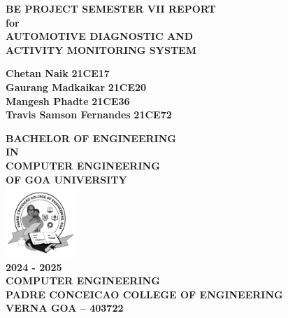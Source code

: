 \begin{titlepage}
    \centering
    \vspace*{0.5cm}
    
    {\Large \textbf{BE PROJECT SEMESTER VII REPORT}}\\[0.3cm]
    {\Large \textbf{for}}\\[0.3cm]
    {\Large \textbf{AUTOMOTIVE DIAGNOSTIC AND }}\\[0.3cm]
    {\Large \textbf{ACTIVITY MONITORING SYSTEM}}\\[0.5cm]

    \large
    \begin{center}
        {\textbf{Chetan Naik}} \hspace{3.7cm} {\textbf{21CE17}}\\[0.1cm]
        {\textbf{Gaurang Madkaikar}} \hspace{2cm} {\textbf{21CE20}}\\[0.1cm]
        {\textbf{Mangesh Phadte}} \hspace{2.8cm} {\textbf{21CE36}}\\[0.1cm]
        {\textbf{Travis Samson Fernandes}} \hspace{0.8cm} {\textbf{21CE72}}
    \end{center}
    
    {\large \textbf{BACHELOR OF ENGINEERING}}\\[0.3cm]
    {\large \textbf{IN}}\\[0.3cm]
    {\large \textbf{COMPUTER ENGINEERING}}\\[0.3cm]
    {\large \textbf{OF GOA UNIVERSITY}}\\[1cm]
    
    \includegraphics[width=0.2\textwidth]{assets/logo.png}\\[0.2cm]
    
    {\LARGE \textbf{2024 - 2025}}\\[1cm]
    
    \large
    \textbf{COMPUTER ENGINEERING}\\[0.3cm]
    \textbf{PADRE CONCEICAO COLLEGE OF ENGINEERING}\\[0.3cm]
    \textbf{VERNA GOA -- 403722}
\end{titlepage}
